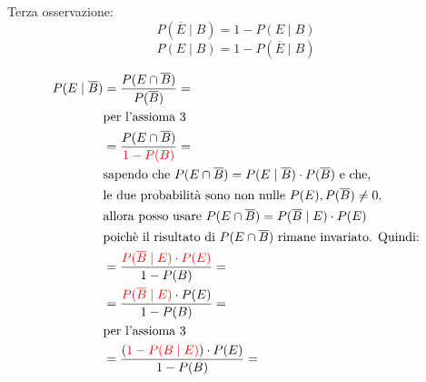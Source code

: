 \documentclass{article}  %
\theoremstyle{definition}
\begin{document}
Terza osservazione:
\[
	P(\overline{E} \mid B)=1-P(E \mid B)
\]
\[
	P(E \mid B)=1-P(\overline{E} \mid B)
\]
\begin{osservazioni}[Osservazione:]
	\begin{align*}
		P(E \mid \overline{B})
		 & = \frac{P(E \cap \overline{B})}{P(\overline{B})} =                                                    \\
		 & \text{per l'assioma 3}                                                                                \\
		 & = \frac{P(E \cap \overline{B})}{\textcolor{red}{1 - P(B)}} =                                          \\
		 & \text{sapendo che } P(E \cap \overline{B})=P(E \mid \overline{B})\cdot P(\overline{B}) \text{ e che,} \\
		 & \text{le due probabilità sono non nulle } P(E),P(\overline{B}) \neq 0,                                \\
		 & \text{allora posso usare } P(E \cap \overline{B})=P(\overline{B} \mid E)\cdot P(E)                    \\
		 & \text{poichè il risultato di } P(E \cap \overline{B}) \text{ rimane invariato. Quindi:}               \\
		 & =  \frac{\textcolor{red}{P(\overline{B} \mid E)\cdot P(E)}}{1 - P(B)}=                                \\
		 & =  \frac{\textcolor{red}{P(\overline{B} \mid E)}\cdot P(E)}{1 - P(B)} =                               \\
		 & \text{per l'assioma 3}                                                                                \\
		 & =  \frac{(\textcolor{red}{1- P(B \mid E)})\cdot P(E)}{1 - P(B)} =
	\end{align*}
\end{osservazioni}
\end{document}
